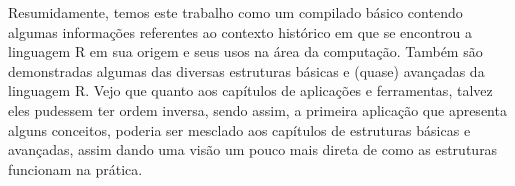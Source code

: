   Resumidamente, temos este trabalho como um compilado básico contendo algumas informações referentes ao contexto histórico em que se encontrou a linguagem R em sua origem e seus usos na área da computação. Também são demonstradas algumas das diversas estruturas básicas e (quase) avançadas da linguagem R. Vejo que quanto aos capítulos de aplicações e ferramentas, talvez eles pudessem ter ordem inversa, sendo assim, a primeira aplicação que apresenta alguns conceitos, poderia ser mesclado aos capítulos de estruturas básicas e avançadas, assim dando uma visão um pouco mais direta de como as estruturas funcionam na prática.